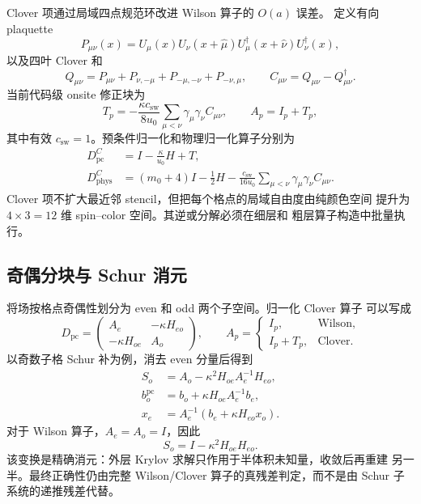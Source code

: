\documentclass[UTF8,a4paper,11pt,fontset=none]{ctexart}
\numberwithin{equation}{section}
\numberwithin{figure}{section}
\numberwithin{table}{section}
\begin{document}
Clover 项通过局域四点规范环改进 Wilson 算子的 \(O(a)\) 误差。
定义有向 plaquette
\begin{equation}
 P_{\mu\nu}(x)=
 U_\mu(x)U_\nu(x+\hat\mu)
 U^\dagger_\mu(x+\hat\nu)U^\dagger_\nu(x),
\label{eq:plaquette}
\end{equation}
以及四叶 Clover 和
\begin{equation}
 Q_{\mu\nu}=P_{\mu\nu}+P_{\nu,-\mu}
 +P_{-\mu,-\nu}+P_{-\nu,\mu},\qquad
 C_{\mu\nu}=Q_{\mu\nu}-Q^\dagger_{\mu\nu}.
\label{eq:clover-loop}
\end{equation}
当前代码级 onsite 修正块为
\begin{equation}
 T_p=-\frac{\kappa c_{\mathrm{sw}}}{8u_0}
 \sum_{\mu<\nu}\gamma_\mu\gamma_\nu C_{\mu\nu},
 \qquad
 A_p=I_p+T_p,
\label{eq:clover-block}
\end{equation}
其中有效 \(c_{\mathrm{sw}}=1\)。预条件归一化和物理归一化算子分别为
\begin{align}
 D^C_{\mathrm{pc}}&=I-\frac{\kappa}{u_0}H+T,
\label{eq:clover-pc}\\
 D^C_{\mathrm{phys}}&=(m_0+4)I-\frac{1}{2}H
 -\frac{c_{\mathrm{sw}}}{16u_0}
 \sum_{\mu<\nu}\gamma_\mu\gamma_\nu C_{\mu\nu}.
\label{eq:clover-phys}
\end{align}
Clover 项不扩大最近邻 stencil，但把每个格点的局域自由度由纯颜色空间
提升为 \(4\times3=12\) 维 spin--color 空间。其逆或分解必须在细层和
粗层算子构造中批量执行。

\subsection{奇偶分块与 Schur 消元}

将场按格点奇偶性划分为 even 和 odd 两个子空间。归一化 Clover 算子
可以写成
\begin{equation}
 D_{\mathrm{pc}}=
 \begin{pmatrix}
 A_e & -\kappa H_{eo}\\
 -\kappa H_{oe} & A_o
 \end{pmatrix},
\qquad
 A_p=
 \begin{cases}
 I_p, & \text{Wilson},\\
 I_p+T_p, & \text{Clover}.
 \end{cases}
\label{eq:even-odd-block}
\end{equation}
以奇数子格 Schur 补为例，消去 even 分量后得到
\begin{align}
 S_o&=A_o-\kappa^2H_{oe}A_e^{-1}H_{eo},
\label{eq:schur}\\
 b_o^{\mathrm{pc}}&=b_o+\kappa H_{oe}A_e^{-1}b_e,
\label{eq:schur-rhs}\\
 x_e&=A_e^{-1}\left(b_e+\kappa H_{eo}x_o\right).
\label{eq:schur-reconstruct}
\end{align}
对于 Wilson 算子，\(A_e=A_o=I\)，因此
\begin{equation}
 S_o=I-\kappa^2H_{oe}H_{eo}.
\label{eq:wilson-schur}
\end{equation}
该变换是精确消元：外层 Krylov 求解只作用于半体积未知量，收敛后再重建
另一半。最终正确性仍由完整 Wilson/Clover 算子的真残差判定，而不是由
Schur 子系统的递推残差代替。
\end{document}
